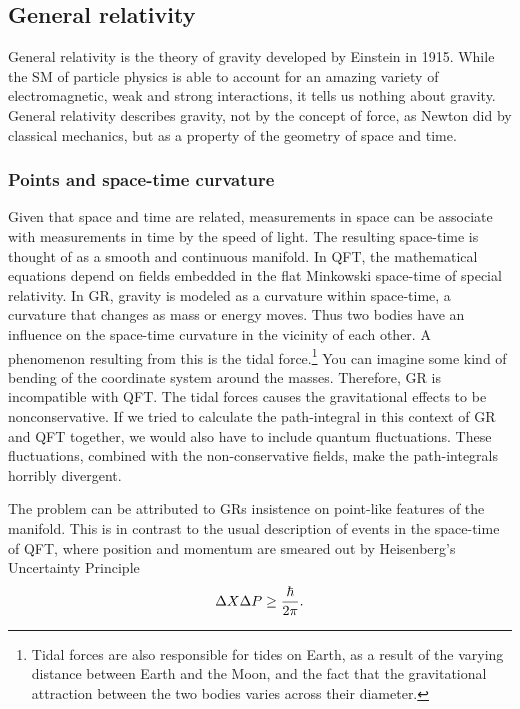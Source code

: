 \subsection{General relativity}
General relativity is the theory of gravity developed by Einstein in 1915. While the SM of particle physics is able to account for an amazing variety of electromagnetic, weak and strong interactions, it tells us nothing about gravity. General relativity describes gravity, not by the concept of force, as Newton did by classical mechanics, but as a property of the geometry of space and time.

\subsubsection{Points and space-time curvature}
Given that space and time are related, measurements in space can be associate with measurements in time by the speed of light. The resulting space-time is thought of as a smooth and continuous manifold. In QFT, the mathematical equations depend on fields embedded in the flat Minkowski space-time of special relativity. In GR, gravity is modeled as a curvature within space-time, a curvature that changes as mass or energy moves. Thus two bodies have an influence on the space-time curvature in the vicinity of each other. A phenomenon resulting from this is the tidal force.\footnote{Tidal forces are also responsible for tides on Earth, as a result of the varying distance between Earth and the Moon, and the fact that the gravitational attraction between the two bodies varies across their diameter.} You can imagine some kind of bending of the coordinate system around the masses. Therefore, GR is incompatible with QFT. The tidal forces causes the gravitational effects to be nonconservative. If we tried to calculate the path-integral in this context of GR and QFT together, we would also have to include quantum fluctuations. These fluctuations, combined with the non-conservative fields, make the path-integrals horribly divergent.

The problem can be attributed to GRs insistence on point-like features of the manifold. This is in contrast to the usual description of events in the space-time of QFT, where position and momentum are smeared out by Heisenberg's Uncertainty Principle
\begin{equation} \label{eq:heisenberg}
	\Delta X \Delta P \geq {\hbar \over 2 \pi}.
\end{equation}

